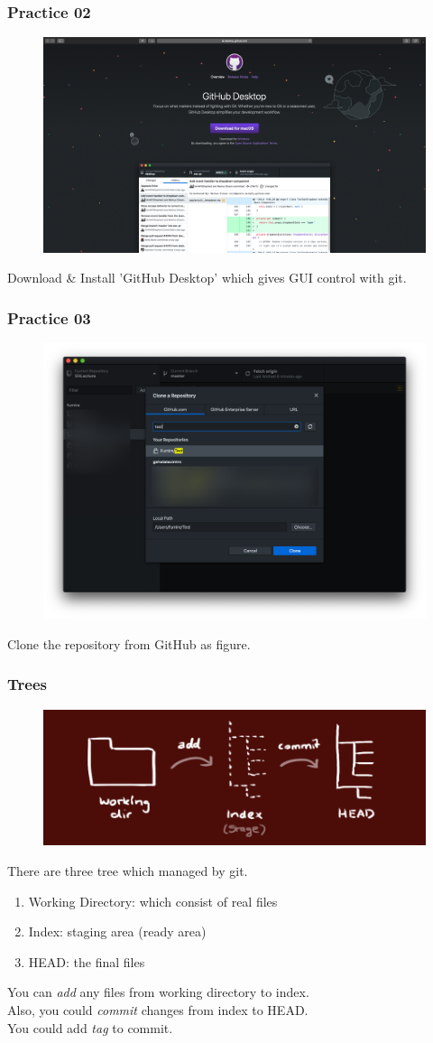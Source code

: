 \documentclass[aspectratio=169]{beamer}
\begin{document}
	\begin{frame}
		\frametitle{Practice 02}
		
		\begin{figure}
			\centering
			\includegraphics[width=0.6 \linewidth]{figures/2.png}
		\end{figure}
	
		Download \& Install 'GitHub Desktop' which gives GUI control with git. 
	\end{frame}

	\begin{frame}
		\frametitle{Practice 03}
		
		\begin{figure}
			\centering
			\includegraphics[width=0.5 \linewidth]{figures/3.png}
		\end{figure}
	
		Clone the repository from GitHub as figure. 
	\end{frame}

	\begin{frame}
		\frametitle{Trees}
		
		\begin{figure}
			\centering
			\includegraphics[width=0.5 \linewidth]{figures/trees.png}
		\end{figure}
	
		There are three tree which managed by git. 
		\begin{enumerate}
			\item Working Directory: which consist of real files
			\item Index: staging area (ready area)
			\item HEAD: the final files
		\end{enumerate}
		You can \textit{add} any files from working directory to index. \\
		Also, you could \textit{commit} changes from index to HEAD. \\
		You could add \textit{tag} to commit. 
	\end{frame}
\end{document}

